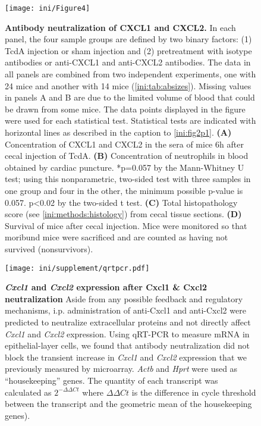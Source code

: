 \begin{figure}
  \centering
  \texttt{[image: ini/Figure4]}
  \caption[Antibody neutralization of CXCL1 and CXCL2]{
       \textbf{Antibody neutralization of CXCL1 and CXCL2.}
        In each panel, the four sample groups are defined by two binary 
        factors: (1) TcdA injection or sham injection and (2) pretreatment 
        with isotype antibodies or anti-CXCL1 and anti-CXCL2 antibodies. 
        The data in all panels are combined from two independent 
        experiments, one with 24 mice and another with 14 mice 
        (\autoref{ini:tab:absizes}). Missing values in panels A and 
        B are due to the limited volume of blood that could be 
        drawn from some mice. The data points displayed in the figure 
        were used for each statistical test. Statistical tests are 
        indicated with horizontal lines as described in the caption 
        to \autoref{ini:fig2p1}. \textbf{(A)} Concentration of CXCL1 
        and CXCL2 in the sera of mice 6h after cecal injection of 
        TcdA. \textbf{(B)} Concentration of neutrophils in blood 
        obtained by cardiac puncture. *p=0.057 by the Mann-Whitney 
        U test; using this nonparametric, two-sided test with three 
        samples in one group and four in the other, the minimum 
        possible p-value is 0.057. p<0.02 by the two-sided t test. 
        \textbf{(C)} Total histopathology score 
        (see \ref{ini:methods:histology}) from cecal tissue 
        sections. \textbf{(D)} Survival of mice after cecal 
        injection. Mice were monitored so that moribund mice 
        were sacrificed and are counted as having not survived (nonsurvivors). 
  }
  \label{ini:fig4}
\end{figure}

\begin{figure}[ht]
\centering
\texttt{[image: ini/supplement/qrtpcr.pdf]}
\caption[\emph{Cxcl1} and \emph{Cxcl2} expression after Cxcl1 \& Cxcl2 neutralization]
{ \textbf{\emph{Cxcl1} and \emph{Cxcl2} expression after Cxcl1 \& Cxcl2 neutralization}
Aside from any possible feedback and regulatory mechanisms, i\@.p\@. administration of anti-Cxcl1 and
anti-Cxcl2 were predicted to neutralize extracellular proteins and not directly affect 
\emph{Cxcl1} and \emph{Cxcl2} expression. Using qRT-PCR to measure mRNA
in epithelial-layer cells, we found that antibody neutralization did not block the transient
increase in \emph{Cxcl1} and \emph{Cxcl2} expression that we previously 
measured by microarray. \emph{Actb} and \emph{Hprt}
were used as ``housekeeping'' genes.
The quantity of each transcript was calculated as $2^{-\Delta \Delta Ct}$ where
$\Delta \Delta Ct$ is the difference in cycle threshold between the transcript and the 
geometric mean of the housekeeping genes).
 }
\label{ini:fig:qrtpcr}
\end{figure}

